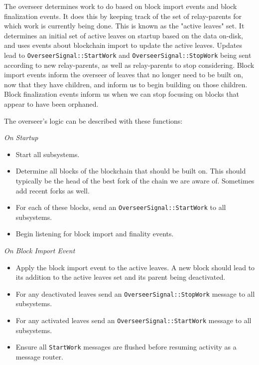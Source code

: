The overseer determines work to do based on block import events and block
finalization events. It does this by keeping track of the set of relay-parents
for which work is currently being done. This is known as the "active leaves"
set. It determines an initial set of active leaves on startup based on the data
on-disk, and uses events about blockchain import to update the active leaves.
Updates lead to \verb|OverseerSignal::StartWork| and \verb|OverseerSignal::StopWork|
being sent according to new relay-parents, as well as relay-parents to stop
considering. Block import events inform the overseer of leaves that no longer
need to be built on, now that they have children, and inform us to begin
building on those children. Block finalization events inform us when we can stop
focusing on blocks that appear to have been orphaned.
\newline

The overseer's logic can be described with these functions:
\newline

\textit{On Startup}

\begin{itemize}
    \item Start all subsystems.
    \item Determine all blocks of the blockchain that should be built on. This
    should typically be the head of the best fork of the chain we are aware of.
    Sometimes add recent forks as well.
    \item For each of these blocks, send an \verb|OverseerSignal::StartWork| to
    all subsystems.
    \item Begin listening for block import and finality events.
\end{itemize}

\textit{On Block Import Event}

\begin{itemize}
    \item Apply the block import event to the active leaves. A new block should
    lead to its addition to the active leaves set and its parent being
    deactivated.
    \item For any deactivated leaves send an \verb|OverseerSignal::StopWork|
    message to all subsystems.
    \item For any activated leaves send an \verb|OverseerSignal::StartWork|
    message to all subsystems.
    \item Ensure all \verb|StartWork| messages are flushed before resuming
    activity as a message router.
\end{itemize}

